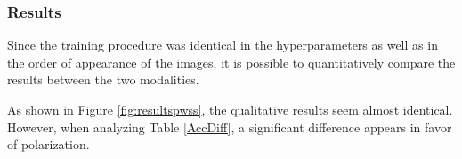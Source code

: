 \subsubsection{Results}

Since the training procedure was identical in the hyperparameters as well as in the order of appearance of the images, it is possible to quantitatively compare the results between the two modalities.


As shown in Figure \ref{fig:resultspwss}, the qualitative results seem almost identical. However, when analyzing Table \ref{AccDiff}, a significant difference appears in favor of polarization. 

\begin{figure}[!htb]
\captionsetup{width=\linewidth}	
\begin{minipage}{0.48\textwidth}
		\captionsetup{width=.8\linewidth}
		\centering
		\begin{subfigure}[b]{0.3\linewidth}
		\end{subfigure}
		\begin{subfigure}[b]{0.3\linewidth}

\end{subfigure}
\end{minipage}
\end{figure}
